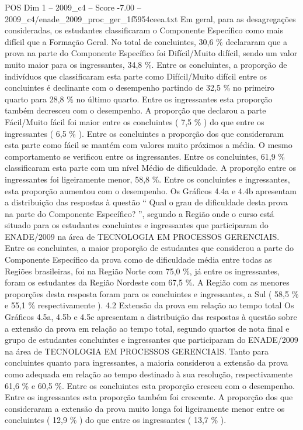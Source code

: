 \begin{textsample}{POS Dim 1 – 2009\_c4 – Score -7.00 – 2009\_c4/enade\_2009\_proc\_ger\_1f5954ceea.txt}
Em geral, para as desagregações consideradas, os estudantes classificaram o Componente Específico como mais difícil que a Formação Geral.
No total de concluintes, 30,6 \% declararam que a prova na parte do Componente Específico foi Difícil/Muito difícil, sendo um valor muito maior para os ingressantes, 34,8 \%.
Entre os concluintes, a proporção de indivíduos que classificaram esta parte como Difícil/Muito difícil entre os concluintes é declinante com o desempenho partindo de 32,5 \% no primeiro quarto para 28,8 \% no último quarto.
Entre os ingressantes esta proporção também decresceu com o desempenho.
A proporção que declarou a parte Fácil/Muito fácil foi maior entre os concluintes ( 7,5 \% ) do que entre os ingressantes ( 6,5 \% ).
Entre os concluintes a proporção dos que consideraram esta parte como fácil se mantém com valores muito próximos a média.
O mesmo comportamento se verificou entre os ingressantes.
Entre os concluintes, 61,9 \% classificaram esta parte com um nível Médio de dificuldade.
A proporção entre os ingressantes foi ligeiramente menor, 58,8 \%.
Entre os concluintes e ingressantes, esta proporção aumentou com o desempenho.
Os Gráficos 4.4a e 4.4b apresentam a distribuição das respostas à questão “ Qual o grau de dificuldade desta prova na parte do Componente Específico? ”, segundo a Região onde o curso está situado para os estudantes concluintes e ingressantes que participaram do ENADE/2009 na área de TECNOLOGIA EM PROCESSOS GERENCIAIS.
Entre os concluintes, a maior proporção de estudantes que considerou a parte do Componente Específico da prova como de dificuldade média entre todas as Regiões brasileiras, foi na Região Norte com 75,0 \%, já entre os ingressantes, foram os estudantes da Região Nordeste com 67,5 \%.
A Região com as menores proporções desta resposta foram para os concluintes e ingressantes, a Sul ( 58,5 \% e 55,1 \% respectivamente ). 4.2 Extensão da prova em relação ao tempo total Os Gráficos 4.5a, 4.5b e 4.5c apresentam a distribuição das respostas à questão sobre a extensão da prova em relação ao tempo total, segundo quartos de nota final e grupo de estudantes concluintes e ingressantes que participaram do ENADE/2009 na área de TECNOLOGIA EM PROCESSOS GERENCIAIS.
Tanto para concluintes quanto para ingressantes, a maioria considerou a extensão da prova como adequada em relação ao tempo destinado à sua resolução, respectivamente 61,6 \% e 60,5 \%.
Entre os concluintes esta proporção cresceu com o desempenho.
Entre os ingressantes esta proporção também foi crescente.
A proporção dos que consideraram a extensão da prova muito longa foi ligeiramente menor entre os concluintes ( 12,9 \% ) do que entre os ingressantes ( 13,7 \% ).

\end{textsample}
